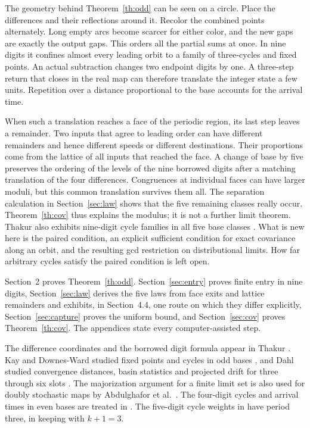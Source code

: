 \documentclass[11pt,reqno]{amsart}
\begin{document}
The geometry behind Theorem~\ref{th:odd} can be seen on a circle. Place
the differences and their reflections around it. Recolor the combined
points alternately. Long empty arcs become scarcer for either color, and
the new gaps are exactly the output gaps. This orders all the partial
sums at once. In nine digits it confines almost every leading orbit to
a family of three-cycles and fixed points. An actual subtraction changes two endpoint digits by one. A
three-step return that closes in the real map can therefore translate
the integer state a few units. Repetition over a distance proportional
to the base accounts for the arrival time.

When such a translation reaches a face of the periodic region, its last
step leaves a remainder. Two inputs that agree to leading order can have
different remainders and hence different speeds or different destinations.
Their proportions come from the lattice of all inputs that reached the face.
A change of base by five preserves the ordering of the levels of the nine borrowed
digits after a matching translation of the four differences. Congruences at
individual faces can have larger moduli, but this common translation survives
them all. The separation calculation in Section~\ref{sec:law} shows that the
five remaining classes really occur. Theorem~\ref{th:cov} thus explains the
modulus; it is not a further limit theorem. Thakur also exhibits nine-digit cycle
families in all five base classes \cite[Section~4.4]{thakur}.
What is new here is the paired condition, an explicit sufficient condition for
exact covariance along an orbit, and the resulting gcd restriction on
distributional limits. How far arbitrary cycles satisfy the paired condition
is left open.

Section~2 proves Theorem~\ref{th:odd}. Section~\ref{sec:entry} proves finite
entry in nine digits, Section~\ref{sec:law} derives the five laws from face
exits and lattice remainders and exhibits, in Section~4.4, one route on which
they differ explicitly, Section~\ref{sec:capture} proves the uniform
bound, and Section~\ref{sec:cov} proves Theorem~\ref{th:cov}. The appendices
state every computer-assisted step.

The difference coordinates and the borrowed digit formula appear in
Thakur \cite[Section 2.7]{thakur}. Kay and Downes-Ward studied fixed points
and cycles in odd bases \cite{kay}, and Dahl studied convergence distances,
basin statistics and projected drift for three through six slots
\cite{Dahl}. The majorization argument for a finite limit set is also used
for doubly stochastic maps by Abdulghafor et al.\ \cite[Theorem 3.3 and
Remark 3.4]{major}. The four-digit cycles and arrival times in even bases
are treated in \cite{G1,G2}. The five-digit cycle weights in \cite{G3} have
period three,
in keeping with $k+1=3$.
\end{document}
